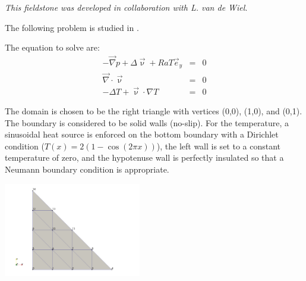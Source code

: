 {\sl This fieldstone was developed in collaboration with L. van de Wiel}. 


The following problem is studied in \cite{jolm17}.

The equation to solve are:
\begin{eqnarray}
-\vec{\nabla}p + \Delta \vec{\upnu} + Ra T \vec{e}_y &=& 0\\
\vec\nabla\cdot\vec\upnu &=& 0 \\
-\Delta T + \vec\upnu\cdot\nabla T &=& 0
\end{eqnarray}

The domain is chosen to be the right triangle
with vertices (0,0), (1,0), and (0,1). 
The boundary is considered to be solid walls (no-slip).
For the temperature, a sinusoidal heat source is enforced on the bottom
boundary with a Dirichlet condition ($T(x)=2(1-\cos (2\pi x))$), 
the left wall is set to a constant temperature
of zero, and the hypotenuse wall is perfectly insulated so that a Neumann 
boundary condition is appropriate.

\begin{center}
\includegraphics[width=6cm]{python_codes/fieldstone_51/minigrid5}
\end{center}




